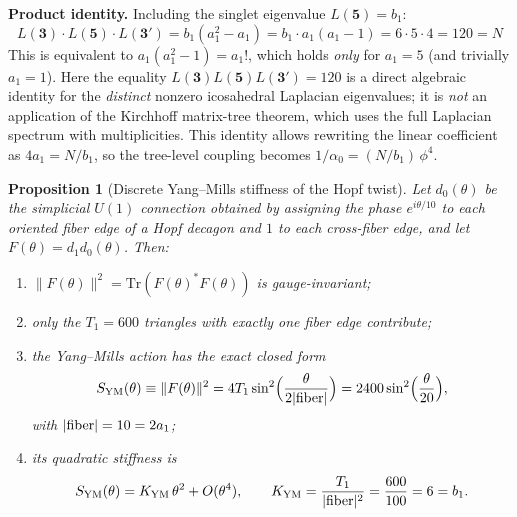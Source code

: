 \documentclass[12pt,a4paper]{article}
\newtheorem{proposition}{Proposition}
\theoremstyle{definition}
\begin{document}
\textbf{Product identity.}  Including the singlet eigenvalue $L(\mathbf{5}) = b_1$:
\begin{equation}
L(\mathbf{3}) \cdot L(\mathbf{5}) \cdot L(\mathbf{3'}) = b_1(a_1^2 - a_1) = b_1 \cdot a_1(a_1-1) = 6 \cdot 5 \cdot 4 = 120 = N
\label{eq:product_identity}
\end{equation}
This is equivalent to $a_1(a_1^2 - 1) = a_1!$, which holds \emph{only} for $a_1 = 5$ (and trivially $a_1 = 1$).  Here the equality $L(\mathbf{3})L(\mathbf{5})L(\mathbf{3'}) = 120$ is a direct algebraic identity for the \emph{distinct} nonzero icosahedral Laplacian eigenvalues; it is \emph{not} an application of the Kirchhoff matrix-tree theorem, which uses the full Laplacian spectrum with multiplicities.  This identity allows rewriting the linear coefficient as $4a_1 = N/b_1$, so the tree-level coupling becomes $1/\alpha_0 = (N/b_1)\,\phi^4$.

\begin{proposition}[Discrete Yang--Mills stiffness of the Hopf twist]\label{prop:ym_stiffness}
Let $d_0(\theta)$ be the simplicial $U(1)$ connection obtained by assigning the phase $e^{i\theta/10}$ to each oriented fiber edge of a Hopf decagon and $1$ to each cross-fiber edge, and let $F(\theta) = d_1 d_0(\theta)$.  Then:
\begin{enumerate}
\item[(i)] $\|F(\theta)\|^2 = \mathrm{Tr}(F(\theta)^*F(\theta))$ is gauge-invariant;
\item[(ii)] only the $T_1 = 600$ triangles with exactly one fiber edge contribute;
\item[(iii)] the Yang--Mills action has the exact closed form
\begin{equation}
S_{\mathrm{YM}}(\theta) \equiv \|F(\theta)\|^2 = 4T_1 \sin^2\!\Big(\frac{\theta}{2|{\rm fiber}|}\Big)
= 2400\sin^2\!\Big(\frac{\theta}{20}\Big),
\label{eq:sym_closed}
\end{equation}
with $|{\rm fiber}| = 10 = 2a_1$;
\item[(iv)] its quadratic stiffness is
\begin{equation}
S_{\mathrm{YM}}(\theta) = K_{\mathrm{YM}}\,\theta^2 + O(\theta^4),
\qquad
K_{\mathrm{YM}} = \frac{T_1}{|{\rm fiber}|^2} = \frac{600}{100} = 6 = b_1.
\label{eq:kym_b1}
\end{equation}
\end{enumerate}
\end{proposition}
\end{document}
